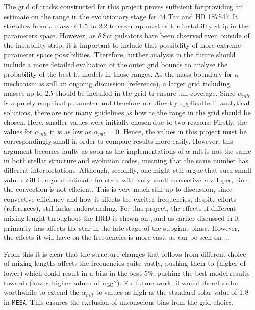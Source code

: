 \begin{itemize}
The grid of tracks constructed for this project proves sufficient for providing an estimate on the range in the evolutionary stage for 44 Tau and HD 187547. It stretches from a mass of 1.5 to 2.2 \msun to cover up most of the instability strip in the parameters space. However, as $\delta$ Sct pulsators have been observed even outside of the instability strip, it is important to include that possibility of more extreme parameter space possibilities. Therefore, further analysis in the future should include a more detailed evaluation of the outer grid bounds to analyse the probability of the best fit models in those ranges. As the mass boundary for $\kappa$ mechanism is still an ongoing discussion (reference), a larger grid including masses up to 2.5 \msun should be included in the grid to ensure full coverage. 
Since $\alpha_{mlt}$ is a purely empirical parameter and therefore not directly applicable in analytical solutions, there are not many guidelines as how to the range in the grid should be chosen. Here, smaller values were initially chosen due to two reasons: Firstly, the values for $\alpha_{mlt}$ in \citep{lenz2010delta} is as low as $\alpha_{mlt}$ = 0. Hence, the values in this project must be correspondingly small in order to compare results more easily. However, this argument becomes faulty as soon as the implementations of $\alpha$ mlt is not the same in both stellar structure and evolution codes, meaning that the same number has different interpretations. Although, secondly, one might still argue that such small values still is a good estimate for stars with very small convective envelopes, since the convection is not efficient. This is very much still up to discussion, since convective efficiency and how it affects the excited frequencies, despite efforts (references), still lacks understanding. For this project, the effects of different mixing lenght throughout the HRD is shown on , and as earlier discussed in  it primarily has affects the star in the late stage of the subgiant phase.  However, the effects it will have on the frequencies is more vast, as can be seen on ...

From this it is clear that the structure changes that follows from different choice of mixing lengths affects the frequencies quite vastly, pushing them to (higher of lower) which could result in a bias in the best 5\%, pushing the best model results towards (lower, higher values of logg?). For future work, it would therefore be worthwhile to extend the $\alpha_{mlt}$ to values as high as the standard solar value of 1.8 in \texttt{MESA}. This ensures the exclusion of unconscious bias from the grid  choice. 
 

\end{itemize}
